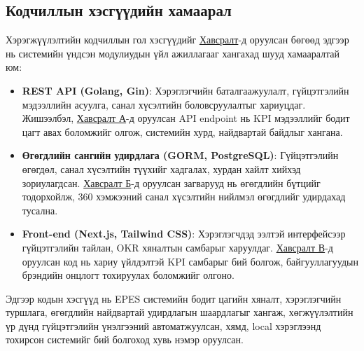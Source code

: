 \subsection{Кодчиллын хэсгүүдийн хамаарал}
Хэрэгжүүлэлтийн кодчиллын гол хэсгүүдийг \hyperref[sec:appendix]{Хавсралт}-д оруулсан бөгөөд эдгээр нь системийн үндсэн модулиудын үйл ажиллагааг хангахад шууд хамааралтай юм:
\begin{itemize}
    \item \textbf{REST API (Golang, Gin)}: Хэрэглэгчийн баталгаажуулалт, гүйцэтгэлийн мэдээллийн асуулга, санал хүсэлтийн боловсруулалтыг хариуцдаг. 
    Жишээлбэл, \hyperref[lst:api]{Хавсралт А}-д оруулсан API endpoint нь KPI мэдээллийг бодит цагт авах боломжийг олгож, системийн хурд, найдвартай байдлыг хангана.
    \item \textbf{Өгөгдлийн сангийн удирдлага (GORM, PostgreSQL)}: Гүйцэтгэлийн өгөгдөл, санал хүсэлтийн түүхийг хадгалах, хурдан хайлт хийхэд зориулагдсан. 
    \hyperref[lst:models]{Хавсралт Б}-д оруулсан загварууд нь өгөгдлийн бүтцийг тодорхойлж, 360 хэмжээний санал хүсэлтийн нийлмэл өгөгдлийг удирдахад тусална.
    \item \textbf{Front-end (Next.js, Tailwind CSS)}: Хэрэглэгчдэд ээлтэй интерфейсээр гүйцэтгэлийн тайлан, OKR хяналтын самбарыг харуулдаг. 
    \hyperref[lst:frontend]{Хавсралт В}-д оруулсан код нь хариу үйлдэлтэй KPI самбарыг бий болгож, байгууллагуудын брэндийн онцлогт тохируулах боломжийг олгоно.
\end{itemize}
Эдгээр кодын хэсгүүд нь EPES системийн бодит цагийн хяналт, хэрэглэгчийн туршлага, өгөгдлийн найдвартай удирдлагын шаардлагыг хангаж, хөгжүүлэлтийн 
үр дүнд гүйцэтгэлийн үнэлгээний автоматжуулсан, хямд, local хэрэглээнд тохирсон системийг бий болгоход хувь нэмэр оруулсан.

